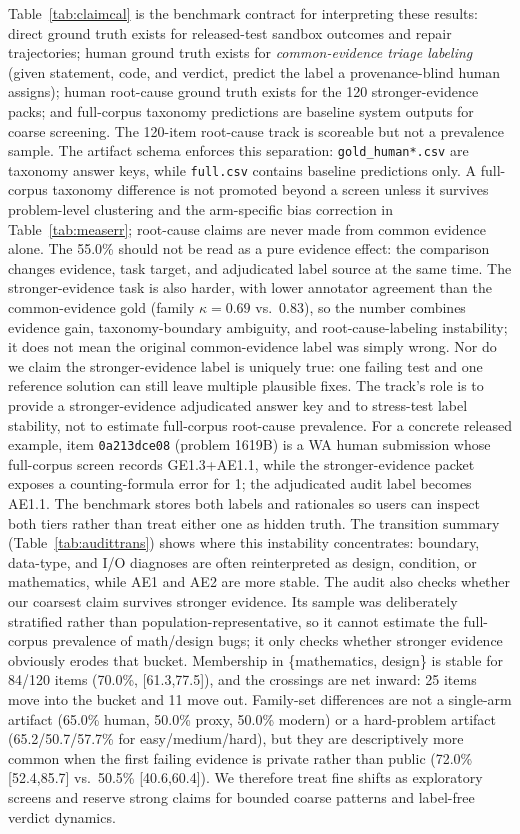 \documentclass[conference]{IEEEtran}
\begin{document}
Table~\ref{tab:claimcal} is the benchmark contract for interpreting these results:
direct ground truth exists for released-test sandbox outcomes and repair trajectories;
human ground truth exists for \emph{common-evidence triage labeling} (given
statement, code, and verdict, predict the label a provenance-blind human assigns);
human root-cause ground truth exists for the 120 stronger-evidence packs; and
full-corpus taxonomy predictions are baseline system outputs for coarse screening.
The 120-item root-cause track is scoreable but not a prevalence sample. The artifact
schema enforces this separation:
\texttt{gold\_human*.csv} are taxonomy answer keys, while \texttt{full.csv}
contains baseline predictions only. A full-corpus taxonomy difference is not promoted beyond a screen
unless it survives problem-level clustering and the arm-specific bias correction in
Table~\ref{tab:measerr}; root-cause claims are never made from common evidence alone.
The 55.0\% should not be read as a pure evidence effect: the comparison changes
evidence, task target, and adjudicated label source at the same time. The
stronger-evidence task is also harder, with lower annotator agreement than the
common-evidence gold (family $\kappa=0.69$ vs.\ 0.83), so the number combines
evidence gain, taxonomy-boundary ambiguity, and root-cause-labeling instability; it
does not mean the original common-evidence label was simply wrong.
Nor do we claim the stronger-evidence label is uniquely true: one failing test and one
reference solution can still leave multiple plausible fixes. The track's role is to
provide a stronger-evidence adjudicated answer key and to stress-test label stability,
not to estimate full-corpus root-cause prevalence.
For a concrete released example, item \texttt{0a213dce08} (problem 1619B) is a WA
human submission whose full-corpus screen records GE1.3+AE1.1, while the
stronger-evidence packet exposes a counting-formula error for 1; the adjudicated
audit label becomes AE1.1. The benchmark stores both labels and rationales so users
can inspect both tiers rather than treat either one as hidden truth.
The transition summary (Table~\ref{tab:audittrans}) shows where this instability
concentrates: boundary, data-type, and I/O diagnoses are often reinterpreted as
design, condition, or mathematics, while AE1 and AE2 are more stable. The audit also
checks whether our coarsest claim survives stronger evidence. Its sample was
deliberately stratified rather than population-representative, so it cannot estimate
the full-corpus prevalence of math/design bugs; it only checks whether stronger
evidence obviously erodes that bucket.
Membership in \{mathematics, design\} is stable for 84/120 items (70.0\%,
[61.3,77.5]), and the crossings are net inward: 25 items move into the bucket and
11 move out. Family-set differences are not a single-arm artifact (65.0\% human,
50.0\% proxy, 50.0\% modern) or a hard-problem artifact (65.2/50.7/57.7\% for
easy/medium/hard), but they are descriptively more common when the first failing
evidence is private rather than public (72.0\% [52.4,85.7] vs.\ 50.5\%
[40.6,60.4]). We therefore
treat fine shifts as exploratory screens and reserve strong claims for bounded
coarse patterns and label-free verdict dynamics.
\end{document}

